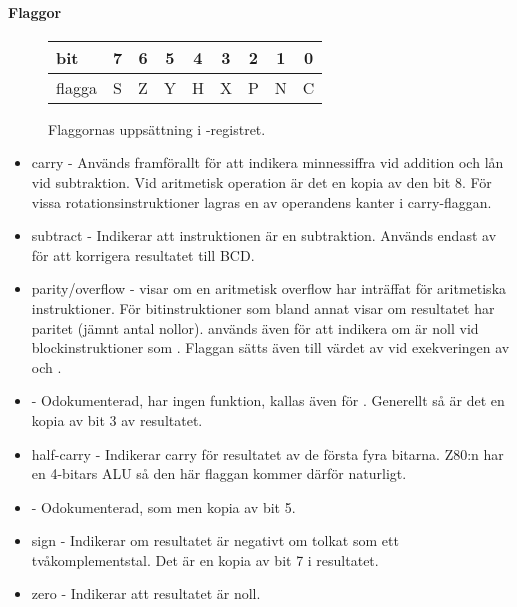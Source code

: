 \documentclass[main.tex]{subfiles}
\begin{document}
\paragraph{Flaggor}
\begin{figure}[H]
    \center
    \begin{tabular}{|l|c|c|c|c|c|c|c|c|}
        \hline
        bit     & 7 & 6 & 5 & 4 & 3 & 2 & 1 & 0 \\ \hline
        flagga  & S & Z & Y & H & X & P & N & C \\ \hline
    \end{tabular}
    \caption{Flaggornas uppsättning i -registret.}
\end{figure}
\begin{itemize}
    \item {} carry - Används framförallt för att indikera minnessiffra
        vid addition och lån vid subtraktion. Vid aritmetisk operation är det
        en kopia av den bit 8. För vissa rotationsinstruktioner lagras en av
        operandens kanter i carry-flaggan.
    \item {} subtract - Indikerar att instruktionen är en subtraktion.
        Används endast av  för att korrigera resultatet till BCD.
    \item {} parity/overflow -  visar om en aritmetisk overflow
        har inträffat för aritmetiska instruktioner. För bitinstruktioner som
        bland annat  visar  om resultatet har paritet (jämnt
        antal nollor).  används även för att indikera om  är
        noll vid blockinstruktioner som . Flaggan sätts även till
        värdet av  vid exekveringen av  och .
    \item {} - Odokumenterad, har ingen funktion, kallas även för
        . Generellt så är det en kopia av bit 3 av resultatet.
    \item {} half-carry - Indikerar carry för resultatet av de första
        fyra bitarna. Z80:n har en 4-bitars ALU så den här flaggan kommer
        därför naturligt.
    \item {} - Odokumenterad, som  men kopia av bit 5.
    \item {} sign - Indikerar om resultatet är negativt om tolkat som ett
        tvåkomplementstal. Det är en kopia av bit 7 i resultatet.
    \item {} zero - Indikerar att resultatet är noll.
\end{itemize}
\end{document}
